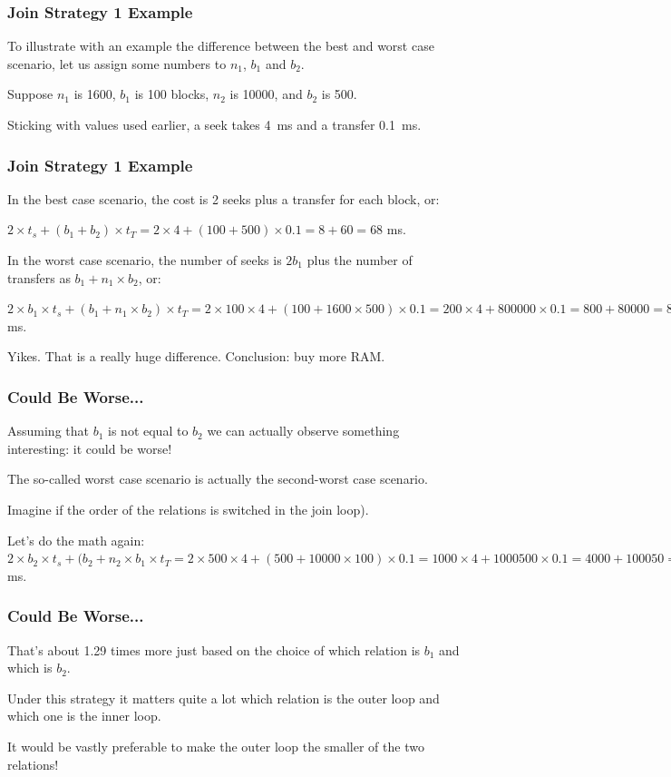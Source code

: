 \begin{frame}
\frametitle{Join Strategy 1 Example}

To illustrate with an example the difference between the best and worst case scenario, let us assign some numbers to $n_{1}$, $b_{1}$ and $b_{2}$. 

Suppose $n_{1}$ is 1600, $b_{1}$ is 100 blocks, $n_{2}$ is 10000, and $b_{2}$ is 500. 

Sticking with values used earlier, a seek takes 4~ms and a transfer 0.1~ms. 

\end{frame}

\begin{frame}
\frametitle{Join Strategy 1 Example}

In the best case scenario, the cost is 2 seeks plus a transfer for each block, or: 

$2 \times t_{s} + (b_{1} + b_{2}) \times t_{T} = 2 \times 4 + (100 + 500) \times 0.1 = 8 + 60 = 68$ ms. 

In the worst case scenario, the number of seeks is $2b_{1}$ plus the number of transfers as $b_{1} + n_{1} \times b_{2}$, or: 

$2 \times b_{1} \times t_{s} + (b_{1} + n_{1} \times b_{2}) \times t_{T} = 2 \times 100 \times 4 + (100 + 1600 \times 500) \times 0.1 = 200 \times 4 + 800000 \times 0.1 = 800 + 80000 = 80800$ ms. 

Yikes. That is a really huge difference. Conclusion: buy more RAM.

\end{frame}

\begin{frame}
\frametitle{Could Be Worse...}
Assuming that $b_{1}$ is not equal to $b_{2}$ we can actually observe something interesting: it could be worse!

 The so-called worst case scenario is actually the second-worst case scenario. 
 
Imagine if the order of the relations is switched in the join loop). 

Let's do the math again: $2 \times b_{2} \times t_{s} + (b_{2} + n_{2} \times b_{1} \times t_{T} = 2 \times 500 \times 4 + (500 + 10000 \times 100) \times 0.1 = 1000 \times 4 + 1000500 \times 0.1 = 4000 + 100050 = 104050$ ms. 

\end{frame}

\begin{frame}
\frametitle{Could Be Worse...}
 That's about 1.29 times more just based on the choice of which relation is $b_{1}$ and which is $b_{2}$.
 
 Under this strategy it matters quite a lot which relation is the outer loop and which one is the inner loop. 
 
 It would be vastly preferable to make the outer loop the smaller of the two relations!

\end{frame}

